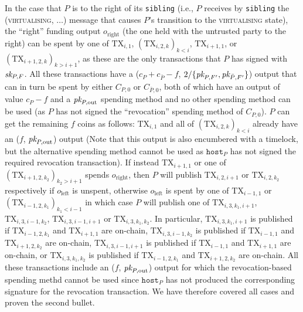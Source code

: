   In the case that $P$ is to the right of its \texttt{sibling} (i.e., $P$
  receives by \texttt{sibling} the (\textsc{virtualising}, $\dots$) message that
  causes $P$'s transition to the \textsc{virtualising} state), the ``right''
  funding output $o_{\mathrm{right}}$ (the one held with the untrusted party to
  the right) can be spent by one of $\mathrm{TX}_{i, 1}$, $(\mathrm{TX}_{i, 2,
  k})_{k < i}$, $\mathrm{TX}_{i+1, 1}$, or $(\mathrm{TX}_{i+1, 2, k})_{k >
  i+1}$, as these are the only transactions that $P$ has signed with $\textit{sk}_{P,
  F}$. All these transactions have a ($c_P + c_{\bar{P}} - f$, $2/\{\textit{pk}_{P, F'},
  \textit{pk}_{\bar{P}, F'}\}$) output that can in turn be spent by either $C_{P, 0}$ or
  $C_{\bar{P}, 0}$, both of which have an output of value $c_P-f$ and a $\textit{pk}_{P,
  \mathrm{out}}$ spending method and no other spending method can be used (as
  $P$ has not signed the ``revocation'' spending method of $C_{P, 0}$). $P$ can
  get the remaining $f$ coins as follows: $\mathrm{TX}_{i, 1}$ and all of
  $(\mathrm{TX}_{i, 2, k})_{k < i}$ already have an ($f$, $\textit{pk}_{P,
  \mathrm{out}}$) output (Note that this output is also
  encumbered with a timelock, but the alternative spending method cannot be used
  as $\texttt{host}_P$ has not signed the required revocation transaction). If
  instead $\mathrm{TX}_{i+1, 1}$ or one of
  $(\mathrm{TX}_{i+1, 2, k_2})_{k_2 > i+1}$ spends $o_{\mathrm{right}}$, then
  $P$ will publish $\mathrm{TX}_{i, 2, i+1}$ or $\mathrm{TX}_{i, 2, k_2}$
  respectively if $o_{\mathrm{left}}$ is unspent, otherwise $o_{\mathrm{left}}$
  is spent by one of $\mathrm{TX}_{i-1, 1}$ or $(\mathrm{TX}_{i-1, 2, k_1})_{k_1
  < i-1}$ in which case $P$ will publish one of $\mathrm{TX}_{i, 3, k_1, i+1}$,
  $\mathrm{TX}_{i, 3, i-1, k_2}$, $\mathrm{TX}_{i, 3, i-1, i+1}$ or
  $\mathrm{TX}_{i, 3, k_1, k_2}$. In particular, $\mathrm{TX}_{i, 3, k_1, i+1}$
  is published if $\mathrm{TX}_{i-1, 2, k_1}$ and $\mathrm{TX}_{i+1, 1}$ are
  on-chain, $\mathrm{TX}_{i, 3, i-1, k_2}$ is published if $\mathrm{TX}_{i-1,
  1}$ and $\mathrm{TX}_{i+1, 2, k_2}$ are on-chain, $\mathrm{TX}_{i, 3, i-1,
  i+1}$ is published if $\mathrm{TX}_{i-1, 1}$ and $\mathrm{TX}_{i+1, 1}$ are
  on-chain, or $\mathrm{TX}_{i, 3, k_1, k_2}$ is published if $\mathrm{TX}_{i-1,
  2, k_1}$ and $\mathrm{TX}_{i+1, 2, k_2}$ are on-chain.  All these transactions
  include an ($f$, $\textit{pk}_{P, \mathrm{out}}$) output for which the revocation-based
  spending methd cannot be used since $\texttt{host}_P$ has not produced the
  corresponding signature for the revocation transaction. We have therefore
  covered all cases and proven the second bullet.

